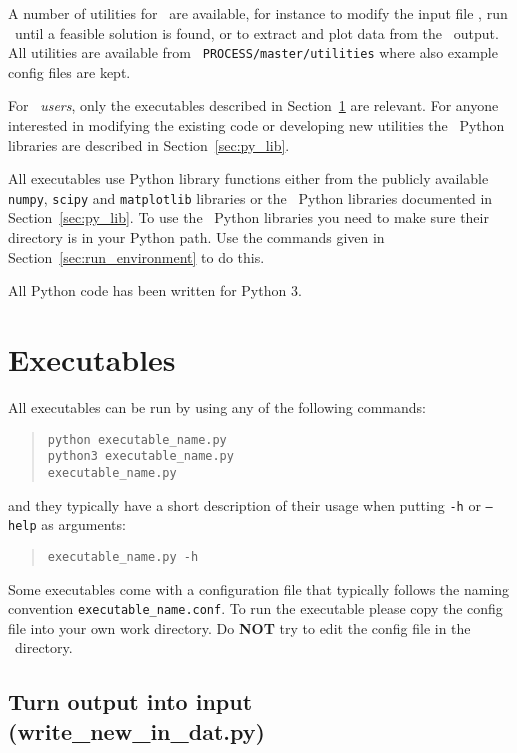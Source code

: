 \label{chap:utilities}

A number of utilities for \process\ are available, for instance to modify the
input file \indat, run \process\ until a feasible solution is found, or to
extract and plot data from the \process\ output. All utilities are available
from \texttt{~PROCESS/master/utilities} where also example config files are kept.

For \process\ \textit{users}, only the executables described in
Section~\ref{sec:py_exec} are relevant. For anyone interested in modifying the
existing code or developing new utilities the \process\ Python
libraries are described in Section~\ref{sec:py_lib}.

All executables use Python library functions either from the publicly
available \texttt{numpy}, \texttt{scipy} and \texttt{matplotlib} libraries or
the \process\ Python libraries documented in Section~\ref{sec:py_lib}. To use
the \process\ Python libraries you need to make sure their directory is in
your Python path. Use the commands given in Section~\ref{sec:run_environment} to
do this.

All Python code has been written for Python 3.

\section{Executables}
\label{sec:py_exec}

All executables can be run by using any of the following commands:
\begin{quote}
\begin{verbatim}
python executable_name.py
python3 executable_name.py
executable_name.py
\end{verbatim}
\end{quote}
and they typically have a short description of their usage when putting
\texttt{-h} or \texttt{--help} as arguments:
\begin{quote}
\begin{verbatim}
executable_name.py -h
\end{verbatim}
\end{quote}

Some executables come with a configuration file that typically follows the
naming convention \texttt{executable\_name.conf}. To run the executable please
copy the config file into your own work directory. Do \textbf{NOT} try to edit
the config file in the \process\ directory.

\subsection{Turn output into input (write\_new\_in\_dat.py)}

